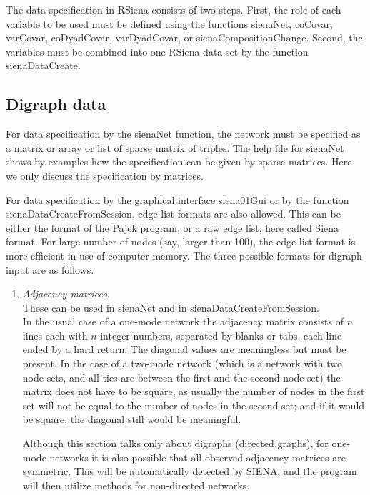\documentclass[a4paper,fleqn,11pt]{article}
\newcommand{\+}{\, + \,}
\newcommand{\sfn}[1]{\textsf{#1}}
\newcommand{\RS}{{\sf RSiena }}
\newcommand{\si}{{\sf SIENA}}
\newcommand{\sn}{{\sf StOCNET}}
\begin{document}
{The data specification in \RS consists of two steps.
First, the role of each variable to be used must be defined using
the functions \sfn{sienaNet}, \sfn{coCovar}, \sfn{varCovar},
\sfn{coDyadCovar}, \sfn{varDyadCovar}, or \sfn{sienaCompositionChange}.
Second, the variables must be combined into one \RS data set by the function
\sfn{sienaDataCreate}.

\subsection{Digraph data}

For data specification by the \textsf{sienaNet} function, the network
must be specified as a matrix or array or list of sparse matrix of triples.
The help file for \sfn{sienaNet} shows by examples how the
specification can be given by sparse matrices.
Here we only discuss the specification by matrices.

For data specification by the graphical interface \textsf{siena01Gui}
or by the function \textsf{sienaDataCreateFromSession},
edge list formats are also allowed. This can be either the
format of the Pajek program, or a raw edge list, here called Siena format.
For large number of nodes (say, larger than 100), the edge list
format is more efficient in use of computer memory.
The three possible formats for digraph input are as follows.
\begin{enumerate}
\item \emph{Adjacency matrices}.\\
      These can be used in  \sfn{sienaNet} and in
      \sfn{sienaDataCreateFromSession}.\\
      In the usual case of a one-mode network the adjacency matrix consists of
      $n$ lines each with $n$ integer numbers,
      separated by blanks or tabs, each line ended by a hard return.
      The diagonal values are meaningless but must be present.
      In the case of a two-mode network (which is a network with two
      node sets, and all ties are between the first and the second node set)
      the matrix does not have to be
      square, as usually the number of nodes in the first set will not be
      equal to the number of nodes in the second set;
      and if it would be square, the diagonal still would be meaningful.

      Although this section talks only about digraphs (directed graphs),
      for one-mode networks it is
      also possible that all observed adjacency matrices are symmetric.
      This will be automatically detected by \si, and
      the program will then utilize methods for non-directed networks.


\end{enumerate}}
\end{document}

